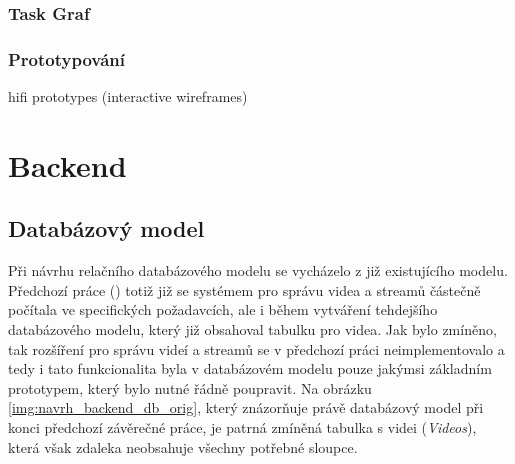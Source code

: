 \documentclass[thesis=M,czech]{FITthesis}[2012/06/26]
\begin{document}
\subsubsection{Task Graf} \label{subsubsec:navrh_frontend_ui_taskgraf}

\subsubsection{Prototypování} \label{subsubsec:navrh_frontend_ui_proto}
hifi prototypes (interactive wireframes)



\section{Backend} \label{sec:navrh_backend}
\subsection{Databázový model} \label{subsec:navrh_backend_databaze}
Při návrhu relačního databázového modelu se vycházelo z již existujícího modelu. Předchozí práce (\cite{solankar}) totiž již se systémem pro správu videa a streamů částečně počítala ve specifických požadavcích, ale i během vytváření tehdejšího databázového modelu, který již obsahoval tabulku pro videa. Jak bylo zmíněno, tak rozšíření pro správu videí a streamů se v předchozí práci neimplementovalo a tedy i tato funkcionalita byla v databázovém modelu pouze jakýmsi základním prototypem, který bylo nutné řádně poupravit. Na obrázku \ref{img:navrh_backend_db_orig}, který znázorňuje právě databázový model při konci předchozí závěrečné práce, je patrná zmíněná tabulka s videi (\textit{Videos}), která však zdaleka neobsahuje všechny potřebné sloupce.
\\
\end{document}
